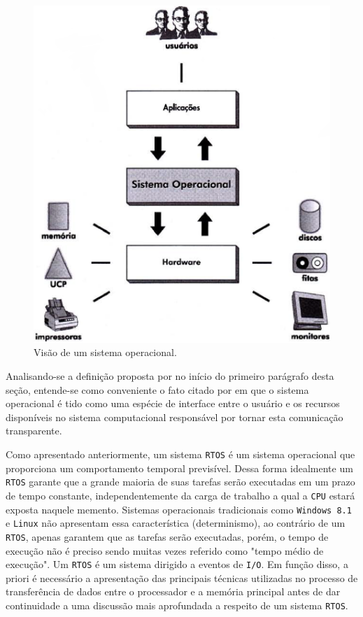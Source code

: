 \begin{figure}[h]
	\centering
	\caption{\label{so}Visão de um sistema operacional.}
		\includegraphics[keepaspectratio=true,scale=0.5]{figuras/so.eps}
\end{figure}

Analisando-se a definição proposta por \cite{limaevilaca} no início do primeiro parágrafo desta seção, entende-se como conveniente o fato citado por \cite{machadomaia} em que o sistema operacional é tido como uma espécie de interface entre o usuário e os recursos disponíveis no sistema computacional responsável por tornar esta comunicação transparente.

Como apresentado anteriormente, um sistema \texttt{RTOS} é um sistema operacional que proporciona um comportamento temporal previsível. Dessa forma idealmente um \texttt{RTOS} garante que a grande maioria de suas tarefas serão executadas em um prazo de tempo constante, independentemente da carga de trabalho a qual a \texttt{CPU} estará exposta naquele memento. Sistemas operacionais tradicionais como \texttt{Windows 8.1} e \texttt{Linux} não apresentam essa característica (determinismo), ao contrário de um \texttt{RTOS}, apenas garantem que as tarefas serão executadas, porém, o tempo de execução não é preciso sendo muitas vezes referido como "tempo médio de execução". Um \texttt{RTOS} é um sistema dirigido a eventos de \texttt{I/O}. Em função disso, a priori é necessário a apresentação das principais técnicas utilizadas no processo de transferência de dados entre o processador e a memória principal antes de dar continuidade a uma discussão mais aprofundada a respeito de um sistema \texttt{RTOS}.

